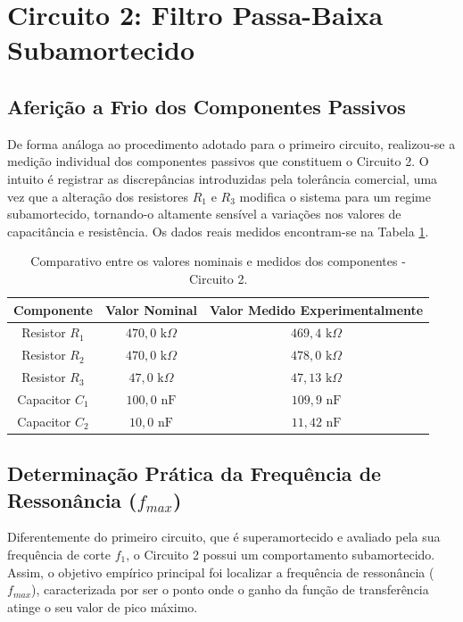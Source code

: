 \section{Circuito 2: Filtro Passa-Baixa Subamortecido}

\subsection{Aferição a Frio dos Componentes Passivos}

De forma análoga ao procedimento adotado para o primeiro circuito, realizou-se a medição individual dos componentes passivos que constituem o Circuito 2. O intuito é registrar as discrepâncias introduzidas pela tolerância comercial, uma vez que a alteração dos resistores $R_1$ e $R_3$ modifica o sistema para um regime subamortecido, tornando-o altamente sensível a variações nos valores de capacitância e resistência. Os dados reais medidos encontram-se na Tabela \ref{tab:componentes_c2}.

\begin{table}[H]
	\centering
	\caption{Comparativo entre os valores nominais e medidos dos componentes - Circuito 2.}
	\label{tab:componentes_c2}
	\renewcommand{\arraystretch}{1.2}
	\begin{tabular}{ccc}
		\hline
		\textbf{Componente} & \textbf{Valor Nominal} & \textbf{Valor Medido Experimentalmente} \\ \hline
		Resistor $R_1$ & $470,0\text{ k}\Omega$ & $469,4\text{ k}\Omega$ \\
		Resistor $R_2$ & $470,0\text{ k}\Omega$ & $478,0\text{ k}\Omega$ \\
		Resistor $R_3$ & $47,0\text{ k}\Omega$ & $47,13\text{ k}\Omega$ \\
		Capacitor $C_1$ & $100,0\text{ nF}$ & $109,9\text{ nF}$ \\
		Capacitor $C_2$ & $10,0\text{ nF}$ & $11,42\text{ nF}$ \\ \hline
	\end{tabular}
\end{table}

\subsection{Determinação Prática da Frequência de Ressonância ($f_{max}$)}

Diferentemente do primeiro circuito, que é superamortecido e avaliado pela sua frequência de corte $f_1$, o Circuito 2 possui um comportamento subamortecido. Assim, o objetivo empírico principal foi localizar a frequência de ressonância ($f_{max}$), caracterizada por ser o ponto onde o ganho da função de transferência atinge o seu valor de pico máximo.

